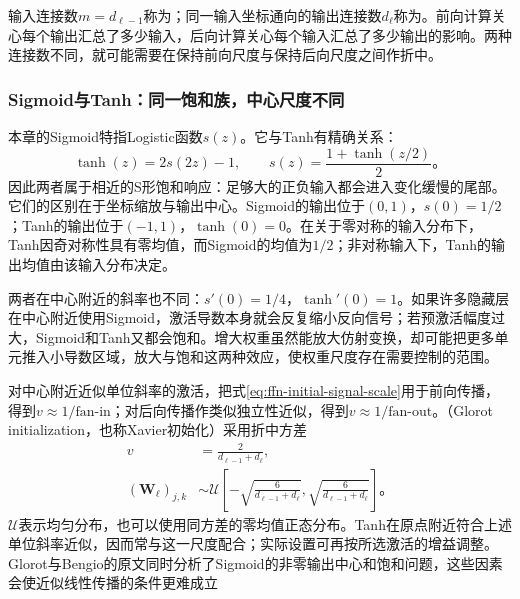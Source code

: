 输入连接数$m=d_{\ell-1}$称为；同一输入坐标通向的输出连接数$d_\ell$称为。前向计算关心每个输出汇总了多少输入，后向计算关心每个输入汇总了多少输出的影响。两种连接数不同，就可能需要在保持前向尺度与保持后向尺度之间作折中。

\subsubsection{Sigmoid与Tanh：同一饱和族，中心尺度不同}
\label{sec:ffn-initialization-saturating}

本章的Sigmoid特指Logistic函数$s(z)$。它与Tanh有精确关系：
\begin{equation}
  \tanh(z)=2s(2z)-1,\qquad
  s(z)=\frac{1+\tanh(z/2)}{2}\text{。}
  \label{eq:ffn-sigmoid-tanh-relation}
\end{equation}
因此两者属于相近的S形饱和响应：足够大的正负输入都会进入变化缓慢的尾部。它们的区别在于坐标缩放与输出中心。Sigmoid的输出位于$(0,1)$，$s(0)=1/2$；Tanh的输出位于$(-1,1)$，$\tanh(0)=0$。在关于零对称的输入分布下，Tanh因奇对称性具有零均值，而Sigmoid的均值为$1/2$；非对称输入下，Tanh的输出均值由该输入分布决定。

两者在中心附近的斜率也不同：$s'(0)=1/4$，$\tanh'(0)=1$。如果许多隐藏层在中心附近使用Sigmoid，激活导数本身就会反复缩小反向信号；若预激活幅度过大，Sigmoid和Tanh又都会饱和。增大权重虽然能放大仿射变换，却可能把更多单元推入小导数区域，放大与饱和这两种效应，使权重尺度存在需要控制的范围。

对中心附近近似单位斜率的激活，把式\eqref{eq:ffn-initial-signal-scale}用于前向传播，得到$v\approx1/\mathrm{fan\text{-}in}$；对后向传播作类似独立性近似，得到$v\approx1/\mathrm{fan\text{-}out}$。（Glorot initialization，也称Xavier初始化）采用折中方差
\begin{equation}
  \begin{aligned}
    v&=\frac{2}{d_{\ell-1}+d_\ell},\\
    (\bm{W}_\ell)_{j,k}&\sim
    \mathcal{U}\!\left[-\sqrt{\frac{6}{d_{\ell-1}+d_\ell}},
    \sqrt{\frac{6}{d_{\ell-1}+d_\ell}}\right]\text{。}
  \end{aligned}
  \label{eq:ffn-glorot-initialization}
\end{equation}
$\mathcal{U}$表示均匀分布，也可以使用同方差的零均值正态分布。Tanh在原点附近符合上述单位斜率近似，因而常与这一尺度配合；实际设置可再按所选激活的增益调整。Glorot与Bengio的原文同时分析了Sigmoid的非零输出中心和饱和问题，这些因素会使近似线性传播的条件更难成立

